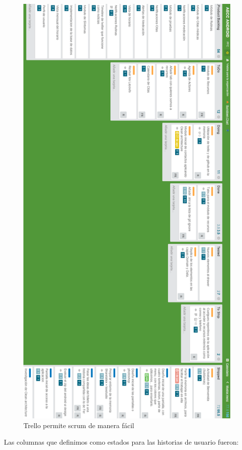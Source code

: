 \documentclass[../pfc.tex]{subfiles}
\begin{document}
	\begin{figure}[H]
		\centering
		\includegraphics[width=0.8\linewidth]{../images/trello_completo}
		\caption{Trello permite scrum de manera fácil}
		\label{fig:trello}
	\end{figure}
	
	Las columnas que definimos como estados para las historias de usuario fueron:
	
\end{document}
